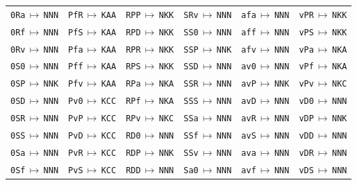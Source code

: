 {\begin{longtable}{@{}llllll@{}}
\texttt{0Ra}\,$\mapsto$\,\texttt{NNN} & \texttt{PfR}\,$\mapsto$\,\texttt{KAA} & \texttt{RPP}\,$\mapsto$\,\texttt{NKK} & \texttt{SRv}\,$\mapsto$\,\texttt{NNN} & \texttt{afa}\,$\mapsto$\,\texttt{NNN} & \texttt{vPR}\,$\mapsto$\,\texttt{NKK} \\
\texttt{0Rf}\,$\mapsto$\,\texttt{NNN} & \texttt{PfS}\,$\mapsto$\,\texttt{KAA} & \texttt{RPD}\,$\mapsto$\,\texttt{NKK} & \texttt{SS0}\,$\mapsto$\,\texttt{NNN} & \texttt{aff}\,$\mapsto$\,\texttt{NNN} & \texttt{vPS}\,$\mapsto$\,\texttt{NKK} \\
\texttt{0Rv}\,$\mapsto$\,\texttt{NNN} & \texttt{Pfa}\,$\mapsto$\,\texttt{KAA} & \texttt{RPR}\,$\mapsto$\,\texttt{NKK} & \texttt{SSP}\,$\mapsto$\,\texttt{NNK} & \texttt{afv}\,$\mapsto$\,\texttt{NNN} & \texttt{vPa}\,$\mapsto$\,\texttt{NKA} \\
\texttt{0S0}\,$\mapsto$\,\texttt{NNN} & \texttt{Pff}\,$\mapsto$\,\texttt{KAA} & \texttt{RPS}\,$\mapsto$\,\texttt{NKK} & \texttt{SSD}\,$\mapsto$\,\texttt{NNN} & \texttt{av0}\,$\mapsto$\,\texttt{NNN} & \texttt{vPf}\,$\mapsto$\,\texttt{NKA} \\
\texttt{0SP}\,$\mapsto$\,\texttt{NNK} & \texttt{Pfv}\,$\mapsto$\,\texttt{KAA} & \texttt{RPa}\,$\mapsto$\,\texttt{NKA} & \texttt{SSR}\,$\mapsto$\,\texttt{NNN} & \texttt{avP}\,$\mapsto$\,\texttt{NNK} & \texttt{vPv}\,$\mapsto$\,\texttt{NKC} \\
\texttt{0SD}\,$\mapsto$\,\texttt{NNN} & \texttt{Pv0}\,$\mapsto$\,\texttt{KCC} & \texttt{RPf}\,$\mapsto$\,\texttt{NKA} & \texttt{SSS}\,$\mapsto$\,\texttt{NNN} & \texttt{avD}\,$\mapsto$\,\texttt{NNN} & \texttt{vD0}\,$\mapsto$\,\texttt{NNN} \\
\texttt{0SR}\,$\mapsto$\,\texttt{NNN} & \texttt{PvP}\,$\mapsto$\,\texttt{KCC} & \texttt{RPv}\,$\mapsto$\,\texttt{NKC} & \texttt{SSa}\,$\mapsto$\,\texttt{NNN} & \texttt{avR}\,$\mapsto$\,\texttt{NNN} & \texttt{vDP}\,$\mapsto$\,\texttt{NNK} \\
\texttt{0SS}\,$\mapsto$\,\texttt{NNN} & \texttt{PvD}\,$\mapsto$\,\texttt{KCC} & \texttt{RD0}\,$\mapsto$\,\texttt{NNN} & \texttt{SSf}\,$\mapsto$\,\texttt{NNN} & \texttt{avS}\,$\mapsto$\,\texttt{NNN} & \texttt{vDD}\,$\mapsto$\,\texttt{NNN} \\
\texttt{0Sa}\,$\mapsto$\,\texttt{NNN} & \texttt{PvR}\,$\mapsto$\,\texttt{KCC} & \texttt{RDP}\,$\mapsto$\,\texttt{NNK} & \texttt{SSv}\,$\mapsto$\,\texttt{NNN} & \texttt{ava}\,$\mapsto$\,\texttt{NNN} & \texttt{vDR}\,$\mapsto$\,\texttt{NNN} \\
\texttt{0Sf}\,$\mapsto$\,\texttt{NNN} & \texttt{PvS}\,$\mapsto$\,\texttt{KCC} & \texttt{RDD}\,$\mapsto$\,\texttt{NNN} & \texttt{Sa0}\,$\mapsto$\,\texttt{NNN} & \texttt{avf}\,$\mapsto$\,\texttt{NNN} & \texttt{vDS}\,$\mapsto$\,\texttt{NNN} \\

\end{longtable}}

